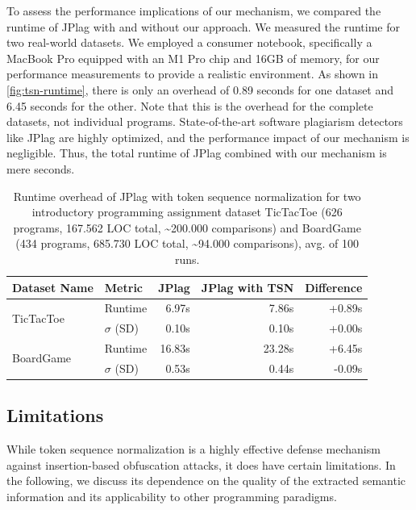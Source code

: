 To assess the performance implications of our mechanism, we compared the runtime of JPlag with and without our approach.
We measured the runtime for two real-world datasets. We employed a consumer notebook, specifically a MacBook Pro equipped with an M1 Pro chip and 16GB of memory, for our performance measurements to provide a realistic environment.
As shown in \autoref{fig:tsn-runtime}, there is only an overhead of 0.89 seconds for one dataset and 6.45 seconds for the other. Note that this is the overhead for the complete datasets, not individual programs. State-of-the-art software plagiarism detectors like JPlag are highly optimized, and the performance impact of our mechanism is negligible. Thus, the total runtime of JPlag combined with our mechanism is mere seconds.

    \begin{table}
	\centering
	\begin{tabular}{llrrr}
		\toprule
		  Dataset Name & Metric     & JPlag     & JPlag with TSN & Difference\\
		\midrule
		\multirow{ 2}{*}{TicTacToe} & Runtime    & 6.97s     &    7.86s   & +0.89s\\
	               &  $\sigma$ (SD)    & 0.10s     &    0.10s &+0.00s\\
        \hline 
        \multirow{ 2}{*}{BoardGame}   & Runtime          & 16.83s     &    23.28s   & +6.45s\\
		              & $\sigma$ (SD)    & 0.53s      &    0.44s    & -0.09s \\
		\bottomrule
    \end{tabular}
    \caption[Runtime Overhead of Token Sequence Normalization]{Runtime overhead of JPlag with token sequence normalization for two introductory programming assignment dataset TicTacToe (626 programs, 167.562 LOC total, \textasciitilde200.000 comparisons) and BoardGame (434 programs, 685.730 LOC total, \textasciitilde94.000 comparisons), avg. of 100 runs.}
	\label{fig:tsn-runtime}
    \end{table}
    

\subsection{Limitations}\label{sec:tsn-limits}

While token sequence normalization is a highly effective defense mechanism against insertion-based obfuscation attacks, it does have certain limitations. In the following, we discuss its dependence on the quality of the extracted semantic information and its applicability to other programming paradigms.

